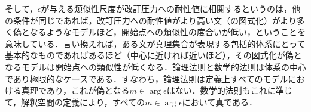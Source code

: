 そして，$\epsilon$が与える類似性尺度が改訂圧力への耐性値に相関するというのは，他の条件が同じであれば，改訂圧力への耐性値がより高い文（の図式化）がより多く偽となるようなモデルほど，開始点への類似性の度合いが低い，ということを意味している．言い換えれば，ある文が真理集合が表現する包括的体系にとって基本的なものであればあるほど（中心に近ければ近いほど），その図式化が偽となるモデルは開始点への類似性が低くなる．論理法則と数学的法則は体系の中心であり極限的なケースである．すなわち，論理法則は定義上すべてのモデルにおける真理であり，これが偽となる$m\in\arg\epsilon$はない．数学的法則もこれに準じて，解釈空間の定義により，すべての$m\in\arg\epsilon$において真である．

